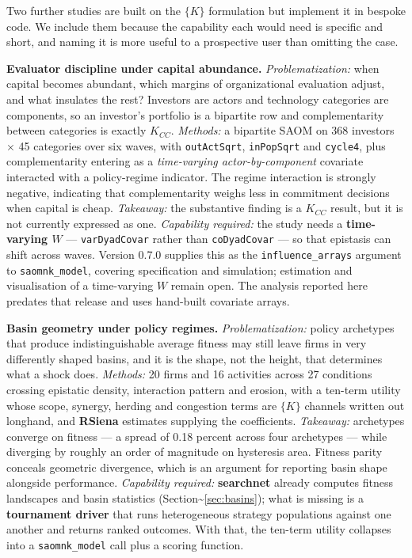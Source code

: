 \documentclass[
]{article}
\begin{document}
Two further studies are built on the \(\{K\}\) formulation but implement
it in bespoke code. We include them because the capability each would
need is specific and short, and naming it is more useful to a
prospective user than omitting the case.

\textbf{Evaluator discipline under capital abundance.}
\emph{Problematization:} when capital becomes abundant, which margins of
organizational evaluation adjust, and what insulates the rest? Investors
are actors and technology categories are components, so an investor's
portfolio is a bipartite row and complementarity between categories is
exactly \(K_{CC}\). \emph{Methods:} a bipartite SAOM on 368 investors
\(\times\) 45 categories over six waves, with \texttt{outActSqrt},
\texttt{inPopSqrt} and \texttt{cycle4}, plus complementarity entering as
a \emph{time-varying actor-by-component} covariate interacted with a
policy-regime indicator. The regime interaction is strongly negative,
indicating that complementarity weighs less in commitment decisions when
capital is cheap. \emph{Takeaway:} the substantive finding is a
\(K_{CC}\) result, but it is not currently expressed as one.
\emph{Capability required:} the study needs a \textbf{time-varying
\(W\)} --- \texttt{varDyadCovar} rather than \texttt{coDyadCovar} --- so
that epistasis can shift across waves. Version 0.7.0 supplies this as
the \texttt{influence\_arrays} argument to \texttt{saomnk\_model},
covering specification and simulation; estimation and visualisation of a
time-varying \(W\) remain open. The analysis reported here predates that
release and uses hand-built covariate arrays.

\textbf{Basin geometry under policy regimes.} \emph{Problematization:}
policy archetypes that produce indistinguishable average fitness may
still leave firms in very differently shaped basins, and it is the
shape, not the height, that determines what a shock does.
\emph{Methods:} 20 firms and 16 activities across 27 conditions crossing
epistatic density, interaction pattern and erosion, with a ten-term
utility whose scope, synergy, herding and congestion terms are \(\{K\}\)
channels written out longhand, and \textbf{RSiena} estimates supplying
the coefficients. \emph{Takeaway:} archetypes converge on fitness --- a
spread of 0.18 percent across four archetypes --- while diverging by
roughly an order of magnitude on hysteresis area. Fitness parity
conceals geometric divergence, which is an argument for reporting basin
shape alongside performance. \emph{Capability required:}
\textbf{searchnet} already computes fitness landscapes and basin
statistics (Section\textasciitilde{}\ref{sec:basins}); what is missing
is a \textbf{tournament driver} that runs heterogeneous strategy
populations against one another and returns ranked outcomes. With that,
the ten-term utility collapses into a \texttt{saomnk\_model} call plus a
scoring function.
\end{document}
